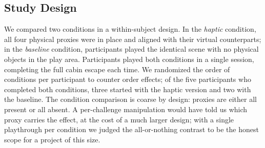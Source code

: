 
\subsection{Study Design}
\label{sec:study-design}

We compared two conditions in a within-subject design. In the \emph{haptic} condition, all four physical proxies were in place and aligned with their virtual counterparts; in the \emph{baseline} condition, participants played the identical scene with no physical objects in the play area. Participants played both conditions in a single session, completing the full cabin escape each time. We randomized the order of conditions per participant to counter order effects; of the five participants who completed both conditions, three started with the haptic version and two with the baseline.
The condition comparison is coarse by design: proxies are either all present or all absent. A per-challenge manipulation would have told us which proxy carries the effect, at the cost of a much larger design; with a single playthrough per condition we judged the all-or-nothing contrast to be the honest scope for a project of this size.
